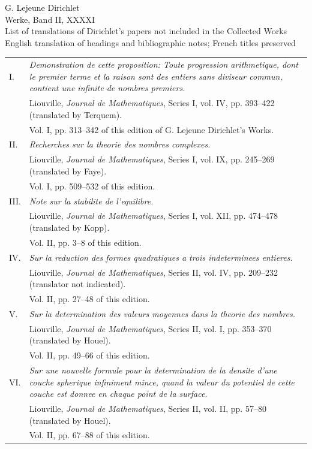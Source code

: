 \documentclass[11pt]{article}
\newcommand{\paperhead}[3]{\begin{center}{\Large G. Lejeune Dirichlet}\\[0.25em]{\large Werke, Band II, #1}\\[0.75em]{\LARGE #2}\\[0.35em]{\large #3}\end{center}\bigskip}
\begin{document}
\paperhead{XXXXI}{List of translations of Dirichlet's papers not included in the Collected Works}{English translation of headings and bibliographic notes; French titles preserved}

\begin{longtable}{@{}p{}p{}@{}}
I. & \emph{Demonstration de cette proposition: Toute progression arithmetique, dont le premier terme et la raison sont des entiers sans diviseur commun, contient une infinite de nombres premiers.}\\
& Liouville, \emph{Journal de Mathematiques}, Series I, vol. IV, pp. 393--422 (translated by Terquem).\\
& Vol. I, pp. 313--342 of this edition of G. Lejeune Dirichlet's Works.\\[0.45em]
II. & \emph{Recherches sur la theorie des nombres complexes.}\\
& Liouville, \emph{Journal de Mathematiques}, Series I, vol. IX, pp. 245--269 (translated by Faye).\\
& Vol. I, pp. 509--532 of this edition.\\[0.45em]
III. & \emph{Note sur la stabilite de l'equilibre.}\\
& Liouville, \emph{Journal de Mathematiques}, Series I, vol. XII, pp. 474--478 (translated by Kopp).\\
& Vol. II, pp. 3--8 of this edition.\\[0.45em]
IV. & \emph{Sur la reduction des formes quadratiques a trois indeterminees entieres.}\\
& Liouville, \emph{Journal de Mathematiques}, Series II, vol. IV, pp. 209--232 (translator not indicated).\\
& Vol. II, pp. 27--48 of this edition.\\[0.45em]
V. & \emph{Sur la determination des valeurs moyennes dans la theorie des nombres.}\\
& Liouville, \emph{Journal de Mathematiques}, Series II, vol. I, pp. 353--370 (translated by Houel).\\
& Vol. II, pp. 49--66 of this edition.\\[0.45em]
VI. & \emph{Sur une nouvelle formule pour la determination de la densite d'une couche spherique infiniment mince, quand la valeur du potentiel de cette couche est donnee en chaque point de la surface.}\\
& Liouville, \emph{Journal de Mathematiques}, Series II, vol. II, pp. 57--80 (translated by Houel).\\
& Vol. II, pp. 67--88 of this edition.\\[0.45em]

\end{longtable}
\end{document}
